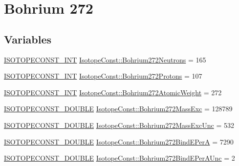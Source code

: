 \hypertarget{group___isotope_const-_bohrium-_bh272}{}\section{Bohrium 272}
\label{group___isotope_const-_bohrium-_bh272}
\subsection*{Variables}
\begin{DoxyCompactItemize}
\item 
\mbox{\hyperlink{group___isotope_const-_macros_ga5f18360b3e99483a35c32d789e62621c}{I\+S\+O\+T\+O\+P\+E\+C\+O\+N\+S\+T\+\_\+\+I\+NT}} \mbox{\hyperlink{group___isotope_const-_bohrium-_bh272_gabd874e2ed92eee3d3a3b001c5f63fa61}{Isotope\+Const\+::\+Bohrium272\+Neutrons}} = 165
\item 
\mbox{\hyperlink{group___isotope_const-_macros_ga5f18360b3e99483a35c32d789e62621c}{I\+S\+O\+T\+O\+P\+E\+C\+O\+N\+S\+T\+\_\+\+I\+NT}} \mbox{\hyperlink{group___isotope_const-_bohrium-_bh272_ga94157df4708e79133bea444d25d1b411}{Isotope\+Const\+::\+Bohrium272\+Protons}} = 107
\item 
\mbox{\hyperlink{group___isotope_const-_macros_ga5f18360b3e99483a35c32d789e62621c}{I\+S\+O\+T\+O\+P\+E\+C\+O\+N\+S\+T\+\_\+\+I\+NT}} \mbox{\hyperlink{group___isotope_const-_bohrium-_bh272_gad6d9999806c65bb8ffe844b9190bac12}{Isotope\+Const\+::\+Bohrium272\+Atomic\+Weight}} = 272
\item 
\mbox{\hyperlink{group___isotope_const-_macros_ga8f45a7272ce02c0b4c65c44636ed719a}{I\+S\+O\+T\+O\+P\+E\+C\+O\+N\+S\+T\+\_\+\+D\+O\+U\+B\+LE}} \mbox{\hyperlink{group___isotope_const-_bohrium-_bh272_gadfa0dafc8583e8bd5ccfa2c739b67d49}{Isotope\+Const\+::\+Bohrium272\+Mass\+Exc}} = 128789
\item 
\mbox{\hyperlink{group___isotope_const-_macros_ga8f45a7272ce02c0b4c65c44636ed719a}{I\+S\+O\+T\+O\+P\+E\+C\+O\+N\+S\+T\+\_\+\+D\+O\+U\+B\+LE}} \mbox{\hyperlink{group___isotope_const-_bohrium-_bh272_gad337058d3f3a58232100b2403d613a91}{Isotope\+Const\+::\+Bohrium272\+Mass\+Exc\+Unc}} = 532
\item 
\mbox{\hyperlink{group___isotope_const-_macros_ga8f45a7272ce02c0b4c65c44636ed719a}{I\+S\+O\+T\+O\+P\+E\+C\+O\+N\+S\+T\+\_\+\+D\+O\+U\+B\+LE}} \mbox{\hyperlink{group___isotope_const-_bohrium-_bh272_ga90c3a067016a2586f739fd08b12f9c0d}{Isotope\+Const\+::\+Bohrium272\+Bind\+E\+PerA}} = 7290
\item 
\mbox{\hyperlink{group___isotope_const-_macros_ga8f45a7272ce02c0b4c65c44636ed719a}{I\+S\+O\+T\+O\+P\+E\+C\+O\+N\+S\+T\+\_\+\+D\+O\+U\+B\+LE}} \mbox{\hyperlink{group___isotope_const-_bohrium-_bh272_ga53c18342f512250a88ed082e0bbe601f}{Isotope\+Const\+::\+Bohrium272\+Bind\+E\+Per\+A\+Unc}} = 2

\end{DoxyCompactItemize}
